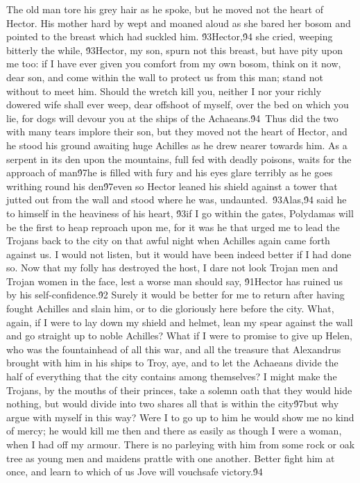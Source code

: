 {The old man tore his grey hair as he spoke, but he moved not the heart of Hector. His mother hard by wept and moaned aloud as she bared her bosom and pointed to the breast which had suckled him. \'93Hector,\'94 she cried, weeping bitterly the while, \'93Hector, my son, spurn not this breast, but have pity upon me too: if I have ever given you comfort from my own bosom, think on it now, dear son, and come within the wall to protect us from this man; stand not without to meet him. Should the wretch kill you, neither I nor your richly dowered wife shall ever weep, dear offshoot of myself, over the bed on which you lie, for dogs will devour you at the ships of the Achaeans.\'94\
Thus did the two with many tears implore their son, but they moved not the heart of Hector, and he stood his ground awaiting huge Achilles as he drew nearer towards him. As a serpent in its den upon the mountains, full fed with deadly poisons, waits for the approach of man\'97he is filled with fury and his eyes glare terribly as he goes writhing round his den\'97even so Hector leaned his shield against a tower that jutted out from the wall and stood where he was, undaunted.\
\'93Alas,\'94 said he to himself in the heaviness of his heart, \'93if I go within the gates, Polydamas will be the first to heap reproach upon me, for it was he that urged me to lead the Trojans back to the city on that awful night when Achilles again came forth against us. I would not listen, but it would have been indeed better if I had done so. Now that my folly has destroyed the host, I dare not look Trojan men and Trojan women in the face, lest a worse man should say, \'91Hector has ruined us by his self-confidence.\'92 Surely it would be better for me to return after having fought Achilles and slain him, or to die gloriously here before the city. What, again, if I were to lay down my shield and helmet, lean my spear against the wall and go straight up to noble Achilles? What if I were to promise to give up Helen, who was the fountainhead of all this war, and all the treasure that Alexandrus brought with him in his ships to Troy, aye, and to let the Achaeans divide the half of everything that the city contains among themselves? I might make the Trojans, by the mouths of their princes, take a solemn oath that they would hide nothing, but would divide into two shares all that is within the city\'97but why argue with myself in this way? Were I to go up to him he would show me no kind of mercy; he would kill me then and there as easily as though I were a woman, when I had off my armour. There is no parleying with him from some rock or oak tree as young men and maidens prattle with one another. Better fight him at once, and learn to which of us Jove will vouchsafe victory.\'94\
}
